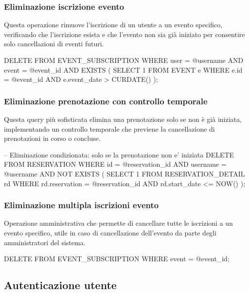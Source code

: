 \documentclass[a4paper,12pt]{report}
\begin{document}
\subsubsection{Eliminazione iscrizione evento}
Questa operazione rimuove l'iscrizione di un utente a un evento specifico, verificando che l'iscrizione esista e che l'evento non sia già iniziato per consentire solo cancellazioni di eventi futuri.

\begin{sqlcode}[caption={Query per eliminazione iscrizione evento}]
DELETE FROM EVENT_SUBSCRIPTION 
WHERE user = @username 
  AND event = @event_id
  AND EXISTS (
    SELECT 1 FROM EVENT e 
    WHERE e.id = @event_id 
    AND e.event_date > CURDATE()
  );
\end{sqlcode}

\subsubsection{Eliminazione prenotazione con controllo temporale}
Questa query più sofisticata elimina una prenotazione solo se non è già iniziata, implementando un controllo temporale che previene la cancellazione di prenotazioni in corso o concluse.

\begin{sqlcode}[caption={Query per eliminazione prenotazione con controllo temporale}]
-- Eliminazione condizionata: solo se la prenotazione non e' iniziata
DELETE FROM RESERVATION 
WHERE id = @reservation_id 
  AND username = @username
  AND NOT EXISTS (
    SELECT 1 FROM RESERVATION_DETAIL rd 
    WHERE rd.reservation = @reservation_id 
    AND rd.start_date <= NOW()
  );
\end{sqlcode}

\subsubsection{Eliminazione multipla iscrizioni evento}
Operazione amministrativa che permette di cancellare tutte le iscrizioni a un evento specifico, utile in caso di cancellazione dell'evento da parte degli amministratori del sistema.

\begin{sqlcode}[caption={Query per eliminazione multipla iscrizioni evento}]
DELETE FROM EVENT_SUBSCRIPTION 
WHERE event = @event_id;
\end{sqlcode}

\subsection{Autenticazione utente} 
\end{document}
